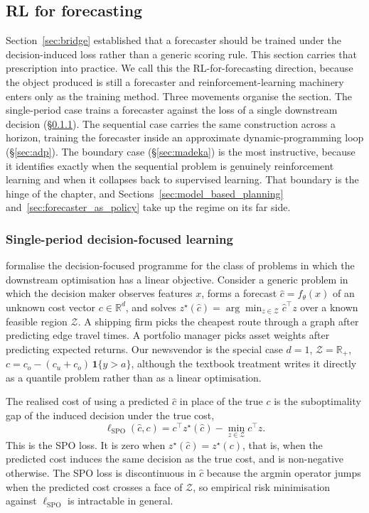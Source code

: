 \subsection{RL for forecasting}
\label{sec:rl_for_forecasting}

Section~\ref{sec:bridge} established that a forecaster should be trained
under the decision-induced loss rather than a generic scoring rule. This
section carries that prescription into practice. We call this the
RL-for-forecasting direction, because the object produced is still a
forecaster and reinforcement-learning machinery enters only as the
training method. Three movements organise the section. The single-period
case trains a forecaster against the loss of a single downstream decision
(\S\ref{sec:dfl}). The sequential case carries the same construction
across a horizon, training the forecaster inside an approximate
dynamic-programming loop (\S\ref{sec:adp}). The boundary case
(\S\ref{sec:madeka}) is the most instructive, because it identifies
exactly when the sequential problem is genuinely reinforcement learning
and when it collapses back to supervised learning. That boundary is the
hinge of the chapter, and Sections~\ref{sec:model_based_planning}
and~\ref{sec:forecaster_as_policy} take up the regime on its far side.

\subsubsection{Single-period decision-focused learning}
\label{sec:dfl}

\citet{ElmachtoubGrigas2022} formalise the decision-focused programme for
the class of problems in which the downstream optimisation has a linear
objective. Consider a generic problem in which the decision maker observes
features $x$, forms a forecast $\hat c = f_\theta(x)$ of an unknown cost
vector $c \in \mathbb R^d$, and solves
$z^\star(\hat c) = \arg\min_{z \in \mathcal Z} \hat c^\top z$ over a known
feasible region $\mathcal Z$. A shipping firm picks the cheapest route
through a graph after predicting edge travel times. A portfolio manager
picks asset weights after predicting expected returns. Our newsvendor is
the special case $d = 1$, $\mathcal Z = \mathbb R_+$,
$c = c_o - (c_u + c_o)\, \mathbf 1\{y > a\}$, although the textbook
treatment writes it directly as a quantile problem rather than as a linear
optimisation.

The realised cost of using a predicted $\hat c$ in place of the true $c$
is the suboptimality gap of the induced decision under the true cost,
\begin{equation}
\ell_{\mathrm{SPO}}(\hat c, c)
= c^\top z^\star(\hat c) - \min_{z \in \mathcal Z} c^\top z.
\label{eq:spo_loss}
\end{equation}
This is the SPO loss. It is zero when $z^\star(\hat c) = z^\star(c)$, that
is, when the predicted cost induces the same decision as the true cost,
and is non-negative otherwise. The SPO loss is discontinuous in $\hat c$
because the argmin operator jumps when the predicted cost crosses a face
of $\mathcal Z$, so empirical risk minimisation against $\ell_{\mathrm{SPO}}$
is intractable in general.

